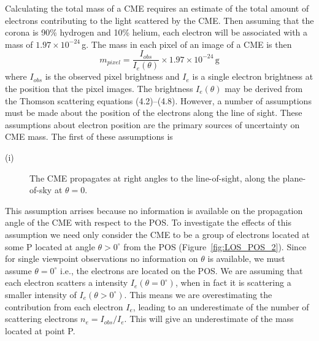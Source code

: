 %
%
%
Calculating the total mass of a CME requires an estimate of the total amount of electrons contributing to the light scattered by the CME. Then assuming that the corona is 90\% hydrogen and 10\% helium, each electron will be associated with a mass of $1.97\times10^{-24}$\,g. The mass in each pixel of an image of a CME is then
\begin{equation}
m_{pixel}=\frac{I_{obs}}{I_e(\theta)} \times1.97\times10^{-24}\,\mathrm{g}
\end{equation}
where $I_{obs}$ is the observed pixel brightness and $I_e$ is a single electron brightness at the position that the pixel images.
The brightness $I_e(\theta)$ may be derived from the Thomson scattering equations (4.2)--(4.8). However, a number of assumptions must be made about the position of the electrons along the line of sight. These assumptions about electron position are the primary sources of uncertainty on CME mass.
%
%
The first of these assumptions is 
\begin{description}
\item[(i)] The CME propagates at right angles to the line-of-sight, along the plane-of-sky at $\theta=0$.
\end{description}
This assumption arrises because no information is available on the propagation angle of the CME with respect to the POS. 
To investigate the effects of this assumption we need only consider the CME to be a group of electrons located at some P located at angle $\theta >0^{\circ}$ from the POS (Figure~\ref{fig:LOS_POS_2}). Since for single viewpoint observations no information on $\theta$ is available, we must assume $\theta=0^{\circ}$ i.e., the electrons are located on the POS. We are assuming that each electron scatters a intensity $I_e(\theta=0^{\circ})$, when in fact it is scattering a smaller intensity of $I_e(\theta>0^{\circ})$. This means we are overestimating the contribution from each electron $I_e$, leading to an underestimate of the number of scattering electrons $n_e = I_{obs}/I_e$. This will give an underestimate of the mass located at point P. 

